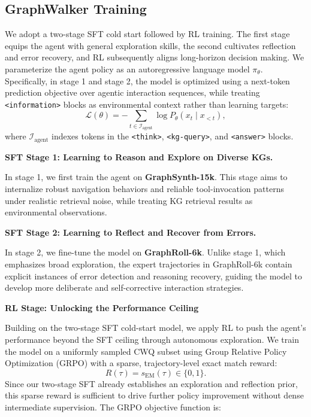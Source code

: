 \subsection{GraphWalker Training}
\label{sec:training}

We adopt a two-stage SFT cold start followed by RL training. 
The first stage equips the agent with general exploration skills, 
the second cultivates reflection and error recovery, and RL 
subsequently aligns long-horizon decision making.
We parameterize the agent policy as an autoregressive language 
model $\pi_\theta$.
Specifically, in stage 1 and stage 2, the model is optimized using a next-token prediction objective over agentic interaction sequences, while treating \texttt{<information>} blocks as environmental context rather than learning targets:
\begin{equation}
\mathcal{L}(\theta) = 
-\sum_{t \in \mathcal{I}_{\text{agent}}} 
\log P_\theta(x_t \mid x_{<t}),
\end{equation}
where $\mathcal{I}_{\text{agent}}$ indexes tokens in the 
\texttt{<think>}, \texttt{<kg-query>}, and \texttt{<answer>} blocks.

\textbf{SFT Stage 1: Learning to Reason and Explore on Diverse KGs.}

In stage 1, we first train the agent on \textbf{GraphSynth-15k}. This stage aims to internalize robust navigation behaviors and 
reliable tool-invocation patterns under realistic retrieval noise, 
while treating KG retrieval results as environmental observations.


\newpage
\textbf{SFT Stage 2: Learning to Reflect and Recover from Errors.}

In stage 2, we fine-tune the model on \textbf{GraphRoll-6k}. 
Unlike stage 1, which emphasizes broad exploration, the expert trajectories in GraphRoll-6k contain explicit instances of error detection and reasoning recovery, guiding the model to develop more deliberate and self-corrective interaction strategies.


\textbf{RL Stage: Unlocking the Performance Ceiling}

Building on the two-stage SFT cold-start model, we apply 
RL to push the agent's performance beyond the SFT ceiling 
through autonomous exploration.
We train the model on a uniformly sampled CWQ subset using Group Relative Policy Optimization (GRPO) \citep{Guo_2025} with a sparse, trajectory-level exact match reward:
\begin{equation}
R(\tau) = s_{\text{EM}}(\tau) \in \{0, 1\}.
\end{equation}
Since our two-stage SFT already establishes an exploration and reflection prior, this sparse reward is sufficient to drive further policy improvement without dense intermediate supervision. The GRPO objective function is:


